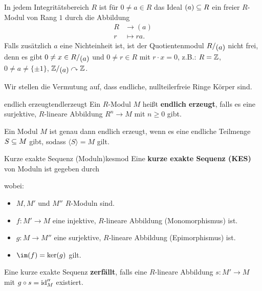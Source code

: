 \begin{beispiel}
In jedem Integritätsbereich $R$ ist für $0 \neq a \in R$ das Ideal $(a) \subseteq R$ ein freier $R$-Modul von Rang $1$ durch die Abbildung
\begin{equation}
\begin{split}
R &\to (a)\\
r &\mapsto ra.
\end{split}
\end{equation}
Falls zusätzlich $a$ eine Nichteinheit ist, ist der Quotientenmodul $\quotient{R}{(a)}$ nicht frei, denn es gibt $0 \neq x \in \quotient{R}{(a)}$ und $0 \neq r \in R$ mit $r \cdot x= 0$, z.B.: $R=\mathbb{Z}$, $0 \neq a \neq \{\pm 1\}$, $\quotient{\Z}{(a)} \acts \Z$.
\end{beispiel}
Wir stellen die Vermutung auf, dass endliche, nullteilerfreie Ringe Körper sind.
\begin{definition}{endlich erzeugt}{endlerzeugt}
Ein $R$-Modul $M$ heißt \textbf{endlich erzeugt}, falls es eine surjektive, $R$-lineare Abbildung $R^n \to M$ mit $n \geq 0$ gibt.
\end{definition}
\begin{bemerkung}
Ein Modul $M$ ist genau dann endlich erzeugt, wenn es eine endliche Teilmenge $S \subseteq M$ gibt, sodass $\langle S \rangle = M$ gilt.
\end{bemerkung}
\begin{definition}{Kurze exakte Sequenz (Moduln)}{kesmod}
Eine \textbf{kurze exakte Sequenz (KES)} von Moduln ist gegeben durch 
\begin{center}
\end{center}
wobei:
\begin{itemize}
\item $M,M'$ und $M''$ $R$-Moduln sind.
\item $f: M' \to M$ eine injektive, $R$-lineare Abbildung (Monomorphismus) ist.
\item $g: M \to M''$ eine surjektive, $R$-lineare Abbildung (Epimorphismus) ist.
\item $\im (f) = \ker (g)$ gilt.
\end{itemize}
Eine kurze exakte Sequenz \textbf{zerfällt}, falls eine $R$-lineare Abbildung $s: M' \to M$ mit $g \circ s = \text{id}_M''$ existiert.
\end{definition}
